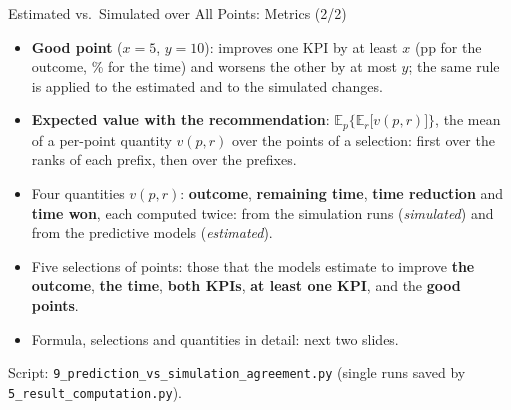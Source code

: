 \documentclass[aspectratio=169]{beamer} %
\begin{document}
\begin{frame}{Estimated vs.\ Simulated over All Points: Metrics (2/2)}
  \footnotesize
  \begin{itemize}
    \item \textbf{Good point} ($x = 5$, $y = 10$): improves one KPI by at least $x$ (pp for the outcome, \% for the
      time) and worsens the other by at most $y$; the same rule is applied to the estimated and to the simulated
      changes.
    \item \textbf{Expected value with the recommendation}: $\mathbb{E}_p\big\{\mathbb{E}_r\big[v(p,r)\big]\big\}$,
      the mean of a per-point quantity $v(p,r)$ over the points of a selection: first over the ranks of each
      prefix, then over the prefixes.
    \item Four quantities $v(p,r)$: \textbf{outcome}, \textbf{remaining time}, \textbf{time reduction} and
      \textbf{time won}, each computed twice: from the simulation runs (\emph{simulated}) and from the predictive
      models (\emph{estimated}).
    \item Five selections of points: those that the models estimate to improve \textbf{the outcome}, \textbf{the
      time}, \textbf{both KPIs}, \textbf{at least one KPI}, and the \textbf{good points}.
    \item Formula, selections and quantities in detail: next two slides.
  \end{itemize}
  {\scriptsize Script: \texttt{9\_prediction\_vs\_simulation\_agreement.py} (single runs saved by \texttt{5\_result\_computation.py}).}
\end{frame}
\end{document}
